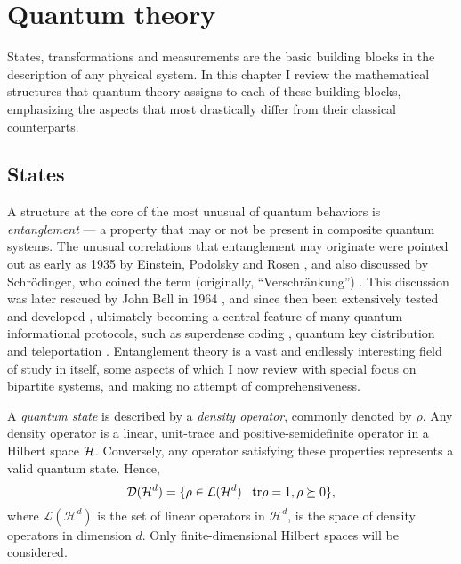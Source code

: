 
\chapter{Quantum theory}
\thispagestyle{empty}  %
\label{chap:quantum-theory}

	States, transformations and measurements are the basic building blocks in the description of any physical system. In this chapter I review the mathematical structures that quantum theory assigns to each of these building blocks, emphasizing the aspects that most drastically differ from their classical counterparts. 

	\section{States}
	\label{sec:states}

		A structure at the core of the most unusual of quantum behaviors is \emph{entanglement} --- a property that may or not be present in composite quantum systems. The unusual correlations that entanglement may originate were pointed out as early as 1935 by Einstein, Podolsky and Rosen \cite{epr}, and also discussed by Schrödinger, who coined the term (originally, ``Verschränkung'') \cite{schrodinger_1935}. This discussion was later rescued by John Bell in 1964 \cite{bell_1964}, and since then been extensively tested and developed \cite{horodecki_2009_entanglement}, ultimately becoming a central feature of many quantum informational protocols, such as superdense coding \cite{bennett_1992_superdense}, quantum key distribution \cite{bb84} and teleportation \cite{bennett_1993_teleporting}. Entanglement theory is a vast and endlessly interesting field of study in itself, some aspects of which I now review with special focus on bipartite systems, and making no attempt of comprehensiveness.

		\ornamentbreak
	
		A \emph{quantum state} is described by a \emph{density operator}, commonly denoted by $\rho$. Any density operator is a linear, unit-trace and positive-semidefinite operator in a Hilbert space $\mathcal{H}$. Conversely, any operator satisfying these properties represents a valid quantum state. Hence,
		\begin{equation}
			\mathcal{D}(\mathcal{H}^{d}) = \{ \rho \in \mathcal{L}(\mathcal{H}^d) \mid \text{tr}\rho=1, \rho \succeq0 \} , 
			\label{eq:density-operator}
		\end{equation}
		where $\mathcal{L}(\mathcal{H}^d)$ is the set of linear operators in $\mathcal{H}^d$, is the space of density operators in dimension $d$. Only finite-dimensional Hilbert spaces will be considered.
	
